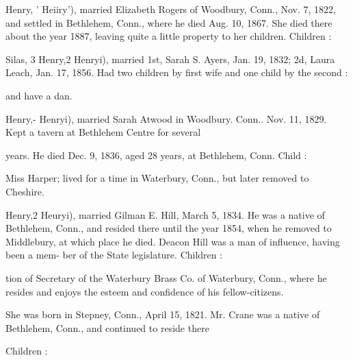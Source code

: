 \documentclass[oneside]{book}
\begin{document}
Henry, ' Heiiry'), married Elizabeth Rogers of Woodbury, Conn., 
Nov. 7, 1822, and settled in Bethlehem, Conn., where he died 
Aug. 10, 1867. She died there about the year 1887, leaving 
quite a little property to her children. Children : 






Silas, 3 Henry,2 Henryi), married 1st, Sarah S. Ayers, Jan. 19, 
1832; 2d, Laura Leach, Jan. 17, 1856. Had two children by 
first wife and one child by the second : 

and have a dan. 

Henry,- Henryi), married Sarah Atwood in Woodbury. Conn.. 
Nov. 11, 1829. Kept a tavern at Bethlehem Centre for several 




years. He died Dec. 9, 1836, aged 28 years, at Bethlehem, 
Conn. Child : 


Miss Harper; lived for a time in Waterbury, Conn., but 
later removed to Cheshire. 

Henry,2 Heuryi), married Gilman E. Hill, March 5, 1834. He 
was a native of Bethlehem, Conn., and resided there until the 
year 1854, when he removed to Middlebury, at which place he 
died. Deacon Hill was a man of influence, having been a mem- 
ber of the State legislature. Children : 



tion of Secretary of the Waterbury Brass Co. of Waterbury, 
Conn., where he resides and enjoys the esteem and confidence 
of his fellow-citizens. 

She was born in Stepney, Conn., April 15, 1821. Mr. Crane 
was a native of Bethlehem, Conn., and continued to reside there 

Children : \\\\
\end{document}
